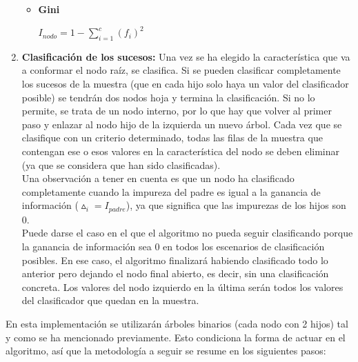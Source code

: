 \documentclass[12pt]{report}\usepackage[]{graphicx}\usepackage[dvipsnames]{xcolor}
\begin{document}
\begin{enumerate}
\begin{itemize}
 					\item \textbf{Gini}
 					
 					\begin{center}
 						$I_{nodo} = 1 - \sum_{i=1}^{c} (f_i)^2$
 					\end{center}
 				\end{itemize}
 				
 				\item \textbf{Clasificación de los sucesos:} Una vez se ha elegido la característica que va a conformar el nodo raíz, se clasifica. Si se pueden clasificar completamente los sucesos de la muestra (que en cada hijo solo haya un valor del clasificador posible) se tendrán dos nodos hoja y termina la clasificación. Si no lo permite, se trata de un nodo interno, por lo que hay que volver al primer paso y enlazar al nodo hijo de la izquierda un nuevo árbol. Cada vez que se clasifique con un criterio determinado, todas las filas de la muestra que contengan ese o esos valores en la característica del nodo se deben eliminar (ya que se considera que han sido clasificadas). \\
 				
 				Una observación a tener en cuenta es que un nodo ha clasificado completamente cuando la impureza del padre es igual a la ganancia de información ($\vartriangle_i = I_{padre}$), ya que significa que las impurezas de los hijos son 0. \\
 				
 				Puede darse el caso en el que el algoritmo no pueda seguir clasificando porque la ganancia de información sea 0 en todos los escenarios de clasificación posibles. En ese caso, el algoritmo finalizará habiendo clasificado todo lo anterior pero dejando el nodo final abierto, es decir, sin una clasificación concreta. Los valores del nodo izquierdo en la última serán todos los valores del clasificador que quedan en la muestra.
 			\end{enumerate}
 			
 			En esta implementación se utilizarán árboles binarios (cada nodo con 2 hijos) tal y como se ha mencionado previamente. Esto condiciona la forma de actuar en el algoritmo, así que la metodología a seguir se resume en los siguientes pasos:
 			
\end{document}
